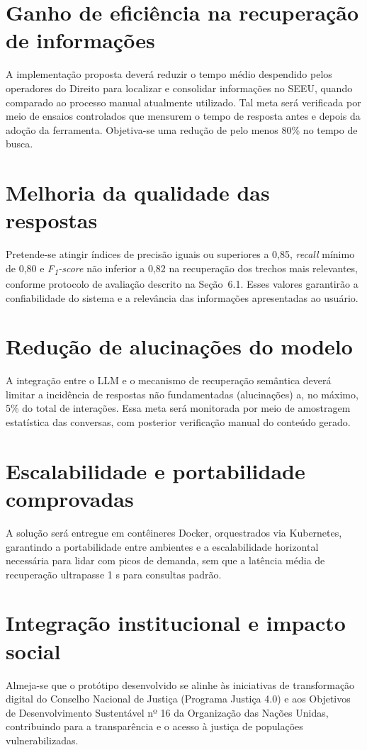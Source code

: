 \section{Ganho de eficiência na recuperação de informações}
A implementação proposta deverá reduzir o tempo médio despendido pelos operadores do Direito para localizar e consolidar informações no SEEU, quando comparado ao processo manual atualmente utilizado. Tal meta será verificada por meio de ensaios controlados que mensurem o tempo de resposta antes e depois da adoção da ferramenta. Objetiva-se uma redução de pelo menos 80\% no tempo de busca.

\section{Melhoria da qualidade das respostas}
Pretende-se atingir índices de precisão iguais ou superiores a 0,85, \emph{recall} mínimo de 0,80 e \emph{F\textsubscript{1}-score} não inferior a 0,82 na recuperação dos trechos mais relevantes, conforme protocolo de avaliação descrito na Seção~6.1. Esses valores garantirão a confiabilidade do sistema e a relevância das informações apresentadas ao usuário.

\section{Redução de alucinações do modelo}
A integração entre o LLM e o mecanismo de recuperação semântica deverá limitar a incidência de respostas não fundamentadas (alucinações) a, no máximo, 5\% do total de interações. Essa meta será monitorada por meio de amostragem estatística das conversas, com posterior verificação manual do conteúdo gerado.

\section{Escalabilidade e portabilidade comprovadas}
A solução será entregue em contêineres Docker, orquestrados via Kubernetes, garantindo a portabilidade entre ambientes e a escalabilidade horizontal necessária para lidar com picos de demanda, sem que a latência média de recuperação ultrapasse 1 s para consultas padrão.

\section{Integração institucional e impacto social}
Almeja-se que o protótipo desenvolvido se alinhe às iniciativas de transformação digital do Conselho Nacional de Justiça (Programa Justiça 4.0) e aos Objetivos de Desenvolvimento Sustentável nº 16 da Organização das Nações Unidas, contribuindo para a transparência e o acesso à justiça de populações vulnerabilizadas.

